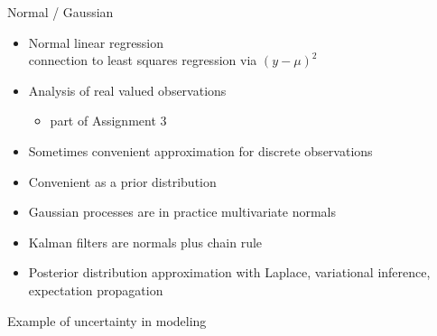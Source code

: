 \documentclass[finnish,english,t]{beamer}
\begin{document}
\begin{frame}{Normal / Gaussian}

  \begin{itemize}
  \item<+-> Normal linear regression\\
    {\color{gray}connection to least squares regression via $(y-\mu)^2$}
  \item<+-> Analysis of real valued observations
    \begin{itemize}
    \item part of Assignment 3
    \end{itemize}
  \item<+-> Sometimes convenient approximation for discrete observations
  \item<+-> Convenient as a prior distribution
  \item<+-> Gaussian processes are in practice multivariate normals
  \item<+-> Kalman filters are normals plus chain rule
  \item<+-> Posterior distribution approximation with Laplace, variational
    inference, expectation propagation
  \end{itemize}
  
\end{frame}

\begin{frame}{Example of uncertainty in modeling}

  

\end{frame}
\end{document}
